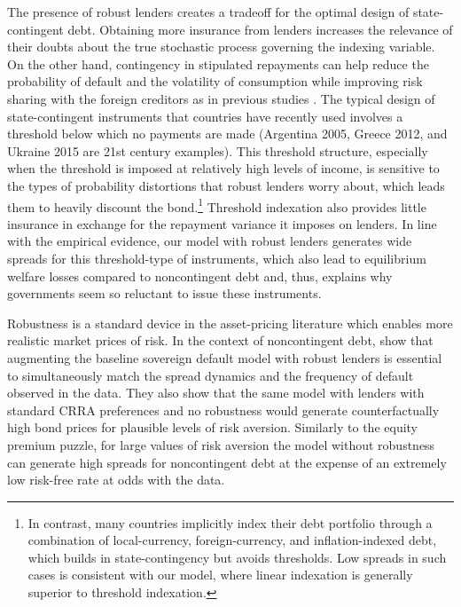 The presence of robust lenders creates a tradeoff for the optimal design of state-contingent debt. Obtaining more insurance from lenders increases the relevance of their doubts about the true stochastic process governing the indexing variable. On the other hand, contingency in stipulated repayments can help reduce the probability of default and the volatility of consumption while improving risk sharing with the foreign creditors as in previous studies \citep[e.g.,][]{HMindexed2012}. The typical design of state-contingent instruments that countries have recently used involves a threshold below which no payments are made (Argentina 2005, Greece 2012, and Ukraine 2015 are 21st century examples). This threshold structure, especially when the threshold is imposed at relatively high levels of income, is sensitive to the types of probability distortions that robust lenders worry about, which leads them to heavily discount the bond.\footnote{In contrast, many countries implicitly index their debt portfolio through a combination of local-currency, foreign-currency, and inflation-indexed debt, which builds in state-contingency but avoids thresholds. Low spreads in such cases is consistent with our model, where linear indexation is generally superior to threshold indexation.} Threshold indexation also provides little insurance in exchange for the repayment variance it imposes on lenders. In line with the empirical evidence, our model with robust lenders generates wide spreads for this threshold-type of instruments, which also lead to equilibrium welfare losses compared to noncontingent debt and, thus, explains why governments seem so reluctant to issue these instruments.

Robustness is a standard device in the asset-pricing literature which enables more realistic market prices of risk. In the context of noncontingent debt, \cite{PouzoPresno2016} show that augmenting the baseline sovereign default model with robust lenders is essential to simultaneously match the spread dynamics and the frequency of default observed in the data. They also show that the same model with lenders with standard CRRA preferences and no robustness would generate counterfactually high bond prices for plausible levels of risk aversion. Similarly to the equity premium puzzle, for large values of risk aversion the model without robustness can generate high spreads for noncontingent debt at the expense of an extremely low risk-free rate at odds with the data.

